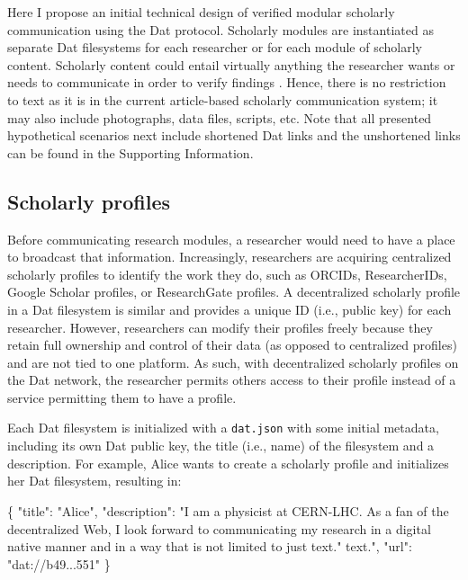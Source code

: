 \documentclass[publications,article,submit,moreauthors,pdftex,10pt,a4paper]{Definitions/mdpi}
\newenvironment{Shaded}{\begin{snugshade}}{\end{snugshade}}
\newcommand{\DataTypeTok}[1]{\textcolor[rgb]{0.13,0.29,0.53}{#1}}
\newcommand{\FunctionTok}[1]{\textcolor[rgb]{0.00,0.00,0.00}{#1}}
\newcommand{\StringTok}[1]{\textcolor[rgb]{0.31,0.60,0.02}{#1}}
\begin{document}
Here I propose an initial technical design of verified modular
scholarly communication using the Dat protocol. Scholarly modules are
instantiated as separate Dat filesystems for each researcher or for
each module of scholarly content. Scholarly content could entail
virtually anything the researcher wants or needs to communicate in
order to verify findings \citep[see also
][]{doi:10.3390/publications6020021}. Hence, there is no restriction
to text as it is in the current article-based scholarly communication
system; it may also include photographs, data files, scripts,
etc. Note that all presented hypothetical scenarios next include
shortened Dat links and the unshortened links can be found in the
Supporting Information.

\subsection*{Scholarly profiles}\label{scholarly-profiles}

Before communicating research modules, a researcher would need to have a
place to broadcast that information. Increasingly, researchers are
acquiring centralized scholarly profiles to identify the work they do,
such as ORCIDs, ResearcherIDs, Google Scholar profiles, or ResearchGate
profiles. A decentralized scholarly profile in a Dat filesystem is
similar and provides a unique ID (i.e., public key) for each researcher.
However, researchers can modify their profiles freely because they
retain full ownership and control of their data (as opposed to
centralized profiles) and are not tied to one platform. As such, with
decentralized scholarly profiles on the Dat network, the researcher
permits others access to their profile instead of a service permitting
them to have a profile.

Each Dat filesystem is initialized with a \texttt{dat.json} with some
initial metadata, including its own Dat public key, the title (i.e.,
name) of the filesystem and a description. For example, Alice wants to
create a scholarly profile and initializes her Dat filesystem, resulting
in:

\begin{Shaded}
\begin{Highlighting}[]
\FunctionTok{\{}
  \DataTypeTok{"title"}\FunctionTok{:} \StringTok{"Alice"}\FunctionTok{,}
  \DataTypeTok{"description"}\FunctionTok{:} \StringTok{"I am a physicist at CERN-LHC. As a fan of the }
  \StringTok{decentralized Web, I look forward to communicating my research in }
  \StringTok{a digital native manner and in a way that is not limited to just text."}
  \StringTok{text."}\FunctionTok{,}
  \DataTypeTok{"url"}\FunctionTok{:} \StringTok{"dat://b49...551"}
\FunctionTok{\}}
\end{Highlighting}
\end{Shaded}
\end{document}
